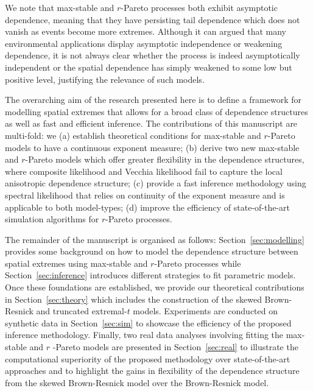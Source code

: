 \documentclass[12pt]{article}
\begin{document}

We note that max-stable and $r$-Pareto processes both exhibit asymptotic dependence, meaning that they have persisting tail dependence which does not vanish as events become more extremes. Although it can argued that many environmental applications display asymptotic independence \citep[e.g.,][]{Bopp.etal:2021, Huser.Wadsworth:2019} or weakening dependence, it is not always clear whether the process is indeed asymptotically independent or the spatial dependence has simply weakened to some low but positive level, justifying the relevance of such models.

The overarching aim of the research presented here is to define a framework for modelling spatial extremes that allows for a broad class of dependence structures as well as fast and efficient inference. The contributions of this manuscript are multi-fold: we (a) establish theoretical conditions for max-stable and $r$-Pareto models to have a continuous exponent measure; (b) derive two new max-stable and $r$-Pareto models which offer greater flexibility in the dependence structures, where composite likelihood and Vecchia likelihood \citet{Huser.Zhong:2023} fail to capture the local anisotropic dependence structure; (c) provide a fast inference methodology using spectral likelihood that relies on continuity of the exponent measure and is applicable to both model-types; (d) improve the efficiency of state-of-the-art simulation algorithms for $r$-Pareto processes.    

The remainder of the manuscript is organised as follows: Section~\ref{sec:modelling} provides some background on how to model the dependence structure between spatial extremes using max-stable and $r$-Pareto processes while Section~\ref{sec:inference} introduces different strategies to fit parametric models. Once these foundations are established, we provide our theoretical contributions in Section~\ref{sec:theory} which includes the construction of the skewed Brown-Resnick and truncated extremal-$t$ models. Experiments are conducted on synthetic data in Section~\ref{sec:sim} to showcase the efficiency of the proposed inference methodology. Finally, two real data analyses involving fitting the max-stable and $r$ -Pareto models are presented in Section~\ref{sec:real} to illustrate the computational superiority of the proposed methodology over state-of-the-art approaches and to highlight the gains in flexibility of the dependence structure from the skewed Brown-Resnick model over the Brown-Resnick model.  
\end{document}

